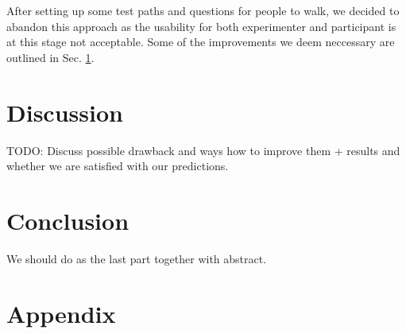 \documentclass[letterpaper]{article}
\begin{document}
After setting up some test paths and questions for people to walk, we decided to abandon this approach as the usability for both experimenter and participant is at this stage not acceptable. Some of the improvements we deem neccessary are outlined in Sec. \ref{sec:discussion}.

\section{Discussion}\label{sec:discussion}
TODO: Discuss possible drawback and ways how to improve them + results and whether we are satisfied with our predictions.

\section{Conclusion}\label{sec:conclusion}
We should do as the last part together with abstract.




\section{Appendix}
\end{document}

